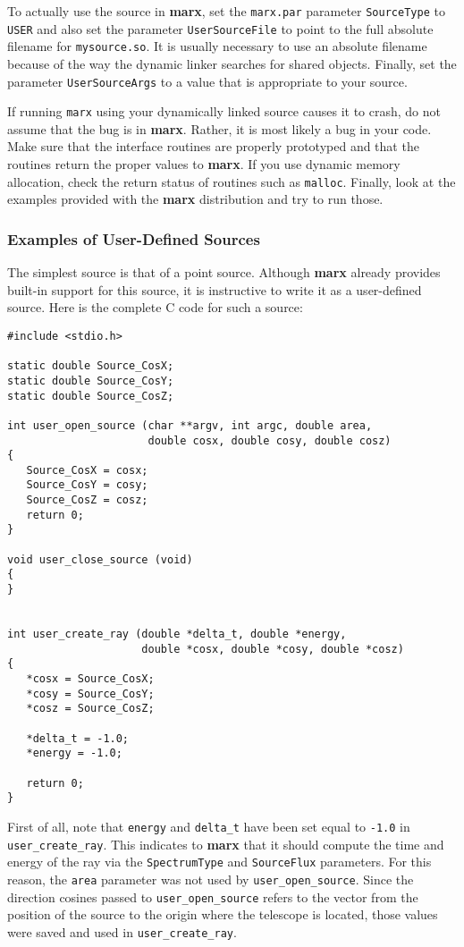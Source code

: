\documentclass{article}
\newcommand{\marx}{{\bf marx}}
\begin{document}
 To actually use the source in \marx{}, set the \verb|marx.par|
 parameter \verb|SourceType| to \verb|USER| and also set the parameter
 \verb|UserSourceFile| to point to the full absolute filename for
 \verb|mysource.so|.  It is usually necessary to use an absolute
 filename because of the way the dynamic linker searches for shared
 objects.  Finally, set the parameter \verb|UserSourceArgs| to a value
 that is appropriate to your source.
 
 If running \verb|marx| using your dynamically linked source causes it
 to crash, do not assume that the bug is in \marx{}.  Rather, it is
 most likely a bug in your code.  Make sure that the interface
 routines are properly prototyped and that the routines return the
 proper values to \marx{}.  If you use dynamic memory allocation, check
 the return status of routines such as \verb|malloc|.  Finally, look
 at the examples provided with the \marx{} distribution and try to run
 those.

\subsubsection{Examples of User-Defined Sources}
 The simplest source is that of a point source.  Although \marx{}
 already provides built-in support for this source, it is instructive
 to write it as a user-defined source.  Here is the complete C code
 for such a source:

\begin{verbatim} 
#include <stdio.h>

static double Source_CosX;
static double Source_CosY;
static double Source_CosZ;

int user_open_source (char **argv, int argc, double area,
                      double cosx, double cosy, double cosz)
{
   Source_CosX = cosx;
   Source_CosY = cosy;
   Source_CosZ = cosz;
   return 0;
}

void user_close_source (void)
{
}


int user_create_ray (double *delta_t, double *energy,
                     double *cosx, double *cosy, double *cosz)
{
   *cosx = Source_CosX;
   *cosy = Source_CosY;
   *cosz = Source_CosZ;

   *delta_t = -1.0;
   *energy = -1.0;
   
   return 0;
}
\end{verbatim}

 First of all, note that \verb|energy| and \verb|delta_t| have been
 set equal to \verb|-1.0| in \verb|user_create_ray|.  This indicates
 to \marx{} that it should compute the time and energy of the ray via
 the \verb|SpectrumType| and \verb|SourceFlux| parameters.  For this
 reason, the \verb|area| parameter was not used by
 \verb|user_open_source|.  Since the direction cosines passed to
 \verb|user_open_source| refers to the vector from the position of the
 source to the origin where the telescope is located, those values
 were saved and used in \verb|user_create_ray|.
\end{document}
